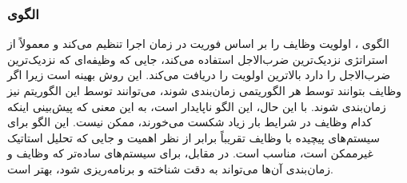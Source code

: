\subsubsection{الگوی }
\label{archConDynPriorSec}
\begin{RTL}
الگوی ، اولویت وظایف را بر اساس فوریت
در زمان اجرا تنظیم می‌کند و معمولاً از استراتژی نزدیک‌ترین ضرب‌الاجل
استفاده می‌کند، جایی که وظیفه‌ای که نزدیک‌ترین ضرب‌الاجل را دارد
بالاترین اولویت را دریافت می‌کند. این روش بهینه است زیرا اگر
وظایف بتوانند توسط هر الگوریتمی زمان‌بندی شوند، می‌توانند توسط این
الگوریتم نیز زمان‌بندی شوند. با این حال، این الگو ناپایدار است،
به این معنی که پیش‌بینی اینکه کدام وظایف در شرایط بار زیاد شکست می‌خورند،
ممکن نیست. این الگو برای سیستم‌های پیچیده با وظایف تقریباً برابر از
نظر اهمیت و جایی که تحلیل استاتیک غیرممکن است، مناسب است.
در مقابل،  برای سیستم‌های
ساده‌تر که وظایف و زمان‌بندی آن‌ها می‌تواند به دقت شناخته و برنامه‌ریزی شود،
بهتر است.
\end{RTL}
